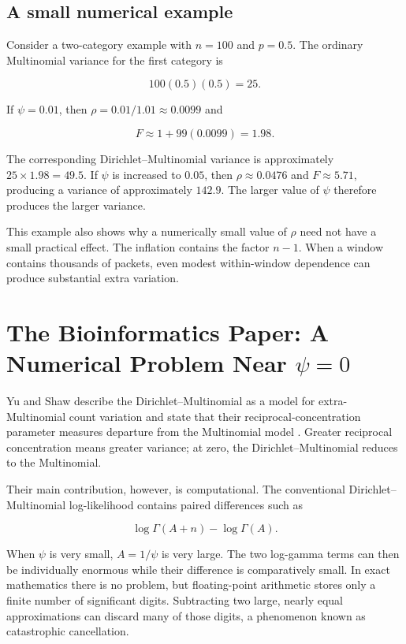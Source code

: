 \documentclass[11pt,a4paper]{article}
\begin{document}
\subsection{A small numerical example}

Consider a two-category example with $n=100$ and $p=0.5$.  The ordinary
Multinomial variance for the first category is

\[
100(0.5)(0.5)=25.
\]

If $\psi=0.01$, then $\rho=0.01/1.01\approx0.0099$ and

\[
F\approx1+99(0.0099)=1.98.
\]

The corresponding Dirichlet--Multinomial variance is approximately
$25\times1.98=49.5$.  If $\psi$ is increased to $0.05$, then
$\rho\approx0.0476$ and $F\approx5.71$, producing a variance of approximately
$142.9$.  The larger value of $\psi$ therefore produces the larger variance.

This example also shows why a numerically small value of $\rho$ need not have
a small practical effect.  The inflation contains the factor $n-1$.  When a
window contains thousands of packets, even modest within-window dependence
can produce substantial extra variation.

\section{The Bioinformatics Paper: A Numerical Problem Near $\psi=0$}

Yu and Shaw describe the Dirichlet--Multinomial as a model for
extra-Multinomial count variation and state that their reciprocal-concentration
parameter measures departure from the Multinomial model
\cite{yu-shaw-2014}.  Greater reciprocal concentration means greater variance;
at zero, the Dirichlet--Multinomial reduces to the Multinomial.

Their main contribution, however, is computational.  The conventional
Dirichlet--Multinomial log-likelihood contains paired differences such as

\[
\log\Gamma(A+n)-\log\Gamma(A).
\]

When $\psi$ is very small, $A=1/\psi$ is very large.  The two log-gamma terms
can then be individually enormous while their difference is comparatively
small.  In exact mathematics there is no problem, but floating-point
arithmetic stores only a finite number of significant digits.  Subtracting
two large, nearly equal approximations can discard many of those digits, a
phenomenon known as catastrophic cancellation.
\end{document}

